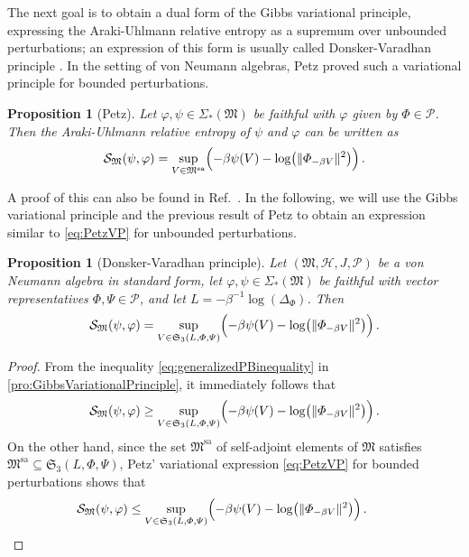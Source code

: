 \documentclass[a4paper, twoside, 11pt, reqno]{amsart}
\theoremstyle{definition}
\theoremstyle{plain}
\newtheorem{proposition}[definition]{Proposition}
\renewcommand{\subset}{\subseteq}
\renewcommand{\Delta}{\varDelta}
\renewcommand{\Sigma}{\varSigma}
\renewcommand{\Phi}{\varPhi}
\renewcommand{\Psi}{\varPsi}
\newcommand{\MH}{\mathcal{H}}
\newcommand{\MS}{\mathcal{S}}
\newcommand{\MFM}{\mathfrak{M}}
\newcommand{\MFS}{\mathfrak{S}}
\newcommand{\NS}[1]{\Sigma_{\ast}(#1)}
\newcommand{\NPC}{\mathcal{P}}
\newcommand{\1}{\mathbf{1}}
\newcommand{\norm}[2][]{#1\Vert{#2}#1\Vert}
\newcommand{\inv}[1]{#1^{-1}}
\begin{document}
The next goal is to obtain a dual form of the Gibbs variational principle, expressing the Araki-Uhlmann relative entropy as a supremum over unbounded perturbations; an expression of this form is usually called Donsker-Varadhan principle \cite[Lem. 2.1]{Donsker1975}. In the setting of von Neumann algebras, Petz \cite[Thm. 9]{Petz1988} proved such a variational principle for bounded perturbations.

\begin{proposition}[Petz]\label{pro:PetzVP}
    Let $\varphi, \psi \in \NS{\MFM}$ be faithful with $\varphi$ given by $\Phi \in \NPC$. Then the Araki-Uhlmann relative entropy of $\psi$ and $\varphi$ can be written as
    \begin{align}\label{eq:PetzVP}
        \MS_\MFM(\psi, \varphi) = \sup_{V \in \MFM^\mathrm{sa}} \Bigl(- \beta \psi(V) - \log \bigl(\norm{\Phi_{- \beta V}}^2\bigr)\Bigr) \, .
    \end{align}
\end{proposition}

A proof of this can also be found in Ref.~\cite[p. 228]{OP2004}. In the following, we will use the Gibbs variational principle and the previous result of Petz to obtain an expression similar to \cref{eq:PetzVP} for unbounded perturbations.

\begin{proposition}[Donsker-Varadhan principle]\label{pro:unboundedDVVP}
    Let $(\MFM, \MH, J, \NPC)$ be a von Neumann algebra in standard form, let $\varphi, \psi \in \NS{\MFM}$ be faithful with vector representatives $\Phi, \Psi \in \NPC$, and let $L = - \inv{\beta} \log(\Delta_\Phi)$. Then
    \begin{equation}\label{eq:unboundedDVVP}
        \MS_\MFM(\psi, \varphi) = \sup_{V \in \MFS_3(L, \Phi, \Psi)} \Bigl(- \beta \psi(V) - \log \bigl(\norm{\Phi_{- \beta V}}^2\bigr)\Bigr) \, .
    \end{equation}
\end{proposition}

\begin{proof}
    From the inequality \eqref{eq:generalizedPBinequality} in \cref{pro:GibbsVariationalPrinciple}, it immediately follows that
    \begin{equation*}
        \MS_\MFM(\psi, \varphi) \ge \sup_{V \in \MFS_3(L, \Phi, \Psi)} \Bigl(- \beta \psi(V) - \log \bigl(\norm{\Phi_{- \beta V}}^2\bigr)\Bigr) \, .
    \end{equation*}
    On the other hand, since the set $\MFM^\mathrm{sa}$ of self-adjoint elements of $\MFM$ satisfies $\MFM^\mathrm{sa} \subset \MFS_3(L, \Phi, \Psi)$, Petz' variational expression \eqref{eq:PetzVP} for bounded perturbations shows that
    \begin{equation*}
        \MS_\MFM(\psi, \varphi) \le \sup_{V \in \MFS_3(L, \Phi, \Psi)} \Bigl(- \beta \psi(V) - \log \bigl(\norm{\Phi_{- \beta V}}^2\bigr)\Bigr) \, . \tag*{\qedhere}
    \end{equation*}
\end{proof}
\end{document}
